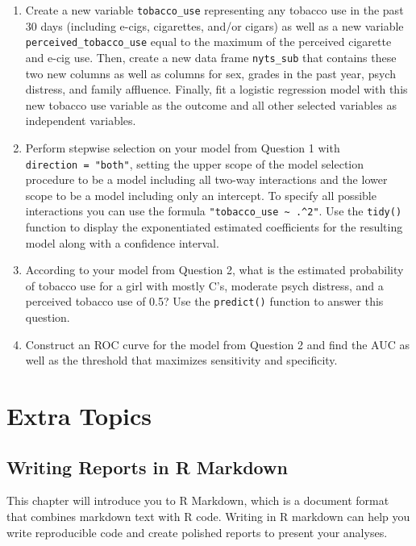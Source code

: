 \documentclass[
  letterpaper,
]{krantz}
\begin{document}
\begin{enumerate}
\def\labelenumi{\arabic{enumi}.}
\item
  Create a new variable \texttt{tobacco\_use} representing any tobacco
  use in the past 30 days (including e-cigs, cigarettes, and/or cigars)
  as well as a new variable \texttt{perceived\_tobacco\_use} equal to
  the maximum of the perceived cigarette and e-cig use. Then, create a
  new data frame \texttt{nyts\_sub} that contains these two new columns
  as well as columns for sex, grades in the past year, psych distress,
  and family affluence. Finally, fit a logistic regression model with
  this new tobacco use variable as the outcome and all other selected
  variables as independent variables.
\item
  Perform stepwise selection on your model from Question 1 with
  \texttt{direction\ =\ "both"}, setting the upper scope of the model
  selection procedure to be a model including all two-way interactions
  and the lower scope to be a model including only an intercept. To
  specify all possible interactions you can use the formula
  \texttt{"tobacco\_use\ \textasciitilde{}\ .\^{}2"}. Use the
  \texttt{tidy()} function to display the exponentiated estimated
  coefficients for the resulting model along with a confidence interval.
\item
  According to your model from Question 2, what is the estimated
  probability of tobacco use for a girl with mostly C's, moderate psych
  distress, and a perceived tobacco use of 0.5? Use the
  \texttt{predict()} function to answer this question.
\item
  Construct an ROC curve for the model from Question 2 and find the AUC
  as well as the threshold that maximizes sensitivity and specificity.
\end{enumerate}

\part{Extra Topics}

\chapter{Writing Reports in R Markdown}\label{sec-rmarkdown}

This chapter will introduce you to R Markdown, which is a document
format that combines markdown text with R code. Writing in R markdown
can help you write reproducible code and create polished reports to
present your analyses.
\end{document}
